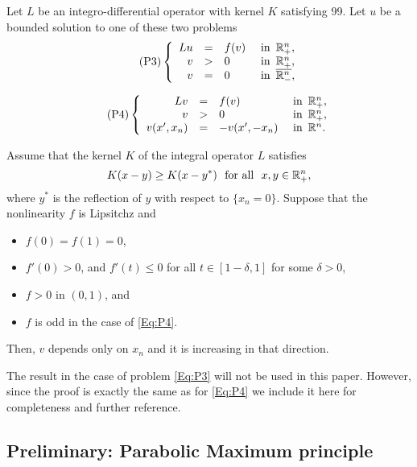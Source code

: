 \begin{theorem}
	\label{Th:SymmHalfSpace}
	Let $L$ be an integro-differential operator with kernel $K$ satisfying 99. Let $u$ be a bounded solution to one of these two problems
	\begin{equation}
	\leqnomode
	\tag{P3}
	\label{Eq:P3}
	\beqc{\PDEsystem}
	Lu &=& f(v)   &\textrm{ in } \,\R^n_+,\\
	v &>& 0   &\textrm{ in } \,\R^n_+,\\
	v &=& 0   &\textrm{ in } \,\overline{\R^n_-},
	\eeqc
	\end{equation}
	
	\begin{equation}
	\leqnomode
	\tag{P4}
	\label{Eq:P4}
	\beqc{\PDEsystem}
	Lv &=& f(v)   &\textrm{ in } \,\R^n_+,\\
	v &>& 0   &\textrm{ in } \,\R^n_+,\\
	v(x',x_n) &=& -v(x',-x_n)   &\textrm{ in } \,\R^n.
	\eeqc
	\end{equation}
	
	\reqnomode
	
	Assume that the kernel $K$ of the integral operator $L$ satisfies
	$$
	K(x-y) \geq K(x-y^*) \,\,\,\,\text{for all } \,\, x,y\in \mathbb{R}^n_+,
	$$
	where $y^*$ is the reflection of $y$ with respect to $\{x_n = 0\}$. Suppose that the nonlinearity $f$ is Lipsitchz and
	\begin{itemize}
		\item $f(0) = f(1) = 0$,
		\item $f'(0)>0$, and $f'(t)\leq 0$ for all $t\in[1-\delta,1]$ for some $\delta>0$,
		\item $f>0$ in $(0,1)$, and
		\item $f$ is odd in the case of \eqref{Eq:P4}.
	\end{itemize}
	Then, $v$ depends only on $x_n$ and it is increasing in that direction.
\end{theorem}


The result in the case of problem \eqref{Eq:P3} will not be used in this paper. However, since the proof is exactly the same as for \eqref{Eq:P4} we include it here for completeness and further reference.

\subsection{Preliminary: Parabolic Maximum principle}





